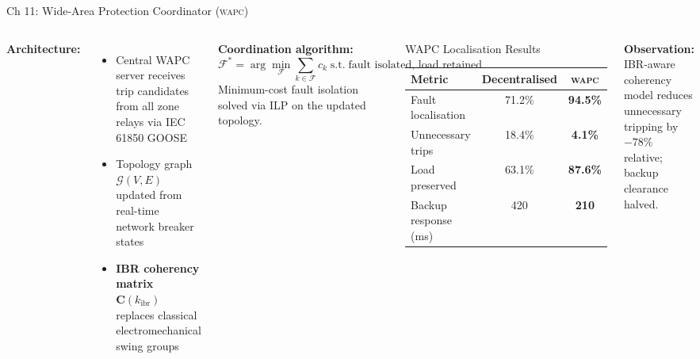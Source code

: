 \documentclass[10pt,aspectratio=169]{beamer}
\newcommand{\obs}[1]{%
  {\color{iitmred}\textbf{Observation:} #1}%
}
\newcommand{\kibr}{k_{\mathrm{ibr}}}
\newcommand{\WAPC}{\textsc{wapc}}
\begin{document}
\begin{frame}{Ch 11: Wide-Area Protection Coordinator (\WAPC)}
  \begin{columns}[T]
      \textbf{Architecture:}
      \begin{itemize}\itemsep3pt
        \item Central WAPC server receives trip
          candidates from all zone relays via IEC 61850 GOOSE
        \item Topology graph $\mathcal{G}(V, E)$ updated
          from real-time network breaker states
        \item \textbf{IBR coherency matrix}
          $\mathbf{C}(\kibr)$ replaces classical
          electromechanical swing groups
      \end{itemize}

      \medskip
      \textbf{Coordination algorithm:}
      \[
        \mathcal{F}^* = \arg\min_{\mathcal{F}}
          \sum_{k \in \mathcal{F}} c_k
          \;\text{s.t.}\;
          \text{fault isolated, load retained}
      \]
      Minimum-cost fault isolation solved via
      ILP on the updated topology.

      \begin{block}{\small WAPC Localisation Results}
        \small
        \begin{tabular}{lcc}
          \toprule
          Metric & Decentralised & \WAPC \\
          \midrule
          Fault localisation & 71.2\% & \textbf{94.5\%}\\
          Unnecessary trips & 18.4\% & \textbf{4.1\%}\\
          Load preserved & 63.1\% & \textbf{87.6\%}\\
          Backup response (ms) & 420 & \textbf{210}\\
          \bottomrule
        \end{tabular}
      \end{block}
      \vspace{0.2cm}
      \obs{IBR-aware coherency model reduces
        unnecessary tripping by $-78\%$ relative;
        backup clearance halved.}
  \end{columns}
\end{frame}
\end{document}
